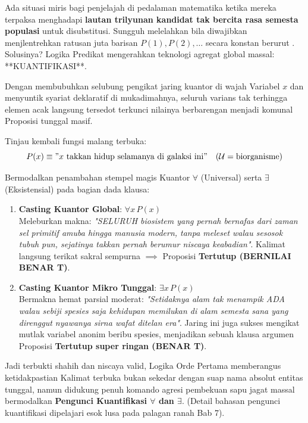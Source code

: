 Ada situasi miris bagi penjelajah di pedalaman matematika ketika mereka terpaksa menghadapi \textbf{lautan trilyunan kandidat tak bercita rasa semesta populasi} untuk disubstitusi. Sungguh melelahkan bila diwajibkan menjlentrehkan ratusan juta barisan $P(1), P(2), \ldots$ secara konstan berurut \cite{wiki_first_order_logic}. Solusinya? Logika Predikat mengerahkan teknologi agregat global massal: **KUANTIFIKASI**.

Dengan membubuhkan selubung pengikat jaring kuantor di wajah Variabel $x$ dan menyuntik syariat deklaratif di mukadimahnya, seluruh varians tak terhingga elemen acak langsung tersedot terkunci nilainya berbarengan menjadi komunal Proposisi tunggal masif.

\begin{contoh}
Tinjau kembali fungsi malang terbuka: 
\[ P(x) \equiv \text{''}x \text{ takkan hidup selamanya di galaksi ini\text{''}} \quad (\mathcal{U} = \text{biorganisme}) \]

Bermodalkan penambahan stempel magis Kuantor $\forall$ (Universal) serta $\exists$ (Eksistensial) pada bagian dada klausa:
\begin{enumerate}
    \item \textbf{Casting Kuantor Global}: $\forall x \, P(x)$ \\
    Meleburkan makna: \textit{"SELURUH biosistem yang pernah bernafas dari zaman sel primitif amuba hingga manusia modern, tanpa meleset walau sesosok tubuh pun, sejatinya takkan pernah berumur niscaya keabadian"}.
    Kalimat langsung terikat sakral sempurna $\implies$ Proposisi \textbf{Tertutup (BERNILAI BENAR T)}.

    \item \textbf{Casting Kuantor Mikro Tunggal}: $\exists x \, P(x)$ \\
    Bermakna hemat parsial moderat: \textit{"Setidaknya alam tak menampik ADA walau sebiji spesies saja kehidupan memilukan di alam semesta sana yang direnggut nyawanya sirna wafat ditelan era"}.
    Jaring ini juga sukses mengikat mutlak variabel anonim beribu spesies, menjadikan sebuah klausa argumen Proposisi \textbf{Tertutup super ringan (BENAR T)}.
\end{enumerate}
\end{contoh}

Jadi terbukti shahih dan niscaya valid, Logika Orde Pertama memberangus ketidakpastian Kalimat terbuka bukan sekedar dengan suap nama absolut entitas tunggal, namun didukung penuh komando agresi pembekuan sapu jagat massal bermodalkan \textbf{Pengunci Kuantifikasi $\forall$ dan $\exists$}. (Detail bahasan pengunci kuantifikasi dipelajari esok lusa pada palagan ranah Bab 7).
